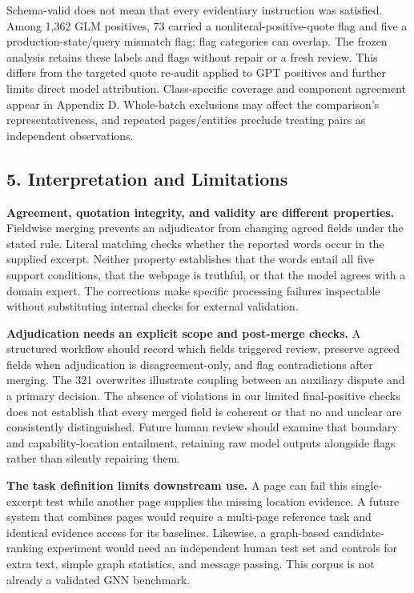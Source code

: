 \documentclass[10pt]{article}
\begin{document}
Schema-valid does not mean that every evidentiary instruction was satisfied. Among 1,362 GLM positives, 73 carried a nonliteral-positive-quote flag and five a production-state/query mismatch flag; flag categories can overlap. The frozen analysis retains these labels and flags without repair or a fresh review. This differs from the targeted quote re-audit applied to GPT positives and further limits direct model attribution. Class-specific coverage and component agreement appear in Appendix D. Whole-batch exclusions may affect the comparison's representativeness, and repeated pages/entities preclude treating pairs as independent observations.

\hypertarget{interpretation-and-limitations}{%
\subsection{5. Interpretation and Limitations}\label{interpretation-and-limitations}}

\textbf{Agreement, quotation integrity, and validity are different properties.} Fieldwise merging prevents an adjudicator from changing agreed fields under the stated rule. Literal matching checks whether the reported words occur in the supplied excerpt. Neither property establishes that the words entail all five support conditions, that the webpage is truthful, or that the model agrees with a domain expert. The corrections make specific processing failures inspectable without substituting internal checks for external validation.

\textbf{Adjudication needs an explicit scope and post-merge checks.} A structured workflow should record which fields triggered review, preserve agreed fields when adjudication is disagreement-only, and flag contradictions after merging. The 321 overwrites illustrate coupling between an auxiliary dispute and a primary decision. The absence of violations in our limited final-positive checks does not establish that every merged field is coherent or that no and unclear are consistently distinguished. Future human review should examine that boundary and capability-location entailment, retaining raw model outputs alongside flags rather than silently repairing them.

\textbf{The task definition limits downstream use.} A page can fail this single-excerpt test while another page supplies the missing location evidence. A future system that combines pages would require a multi-page reference task and identical evidence access for its baselines. Likewise, a graph-based candidate-ranking experiment would need an independent human test set and controls for extra text, simple graph statistics, and message passing. This corpus is not already a validated GNN benchmark.
\end{document}
